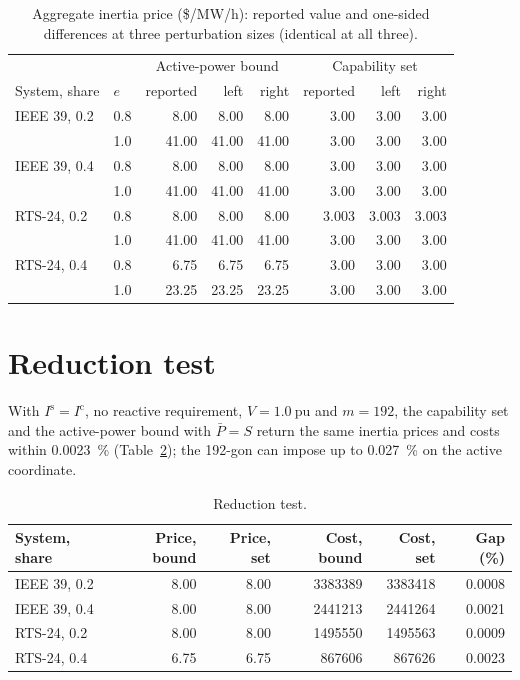 \documentclass[11pt,a4paper]{article}
\newcommand{\pu}{\ensuremath{\mathrm{pu}}}
\begin{document}
\begin{table}[h]
  \caption{Aggregate inertia price (\$/MW/h): reported value and one-sided
  differences at three perturbation sizes (identical at all three).}
  \label{tab:brackets}
  \centering
  \begin{tabular}{ll rrr rrr}
    \toprule
    & & \multicolumn{3}{c}{Active-power bound} & \multicolumn{3}{c}{Capability set} \\
    \cmidrule(lr){3-5}\cmidrule(l){6-8}
    System, share & $e$ & reported & left & right & reported & left & right \\
    \midrule
    IEEE 39, 0.2 & 0.8 & 8.00 & 8.00 & 8.00 & 3.00 & 3.00 & 3.00 \\
                 & 1.0 & 41.00 & 41.00 & 41.00 & 3.00 & 3.00 & 3.00 \\
    IEEE 39, 0.4 & 0.8 & 8.00 & 8.00 & 8.00 & 3.00 & 3.00 & 3.00 \\
                 & 1.0 & 41.00 & 41.00 & 41.00 & 3.00 & 3.00 & 3.00 \\
    RTS-24, 0.2  & 0.8 & 8.00 & 8.00 & 8.00 & 3.003 & 3.003 & 3.003 \\
                 & 1.0 & 41.00 & 41.00 & 41.00 & 3.00 & 3.00 & 3.00 \\
    RTS-24, 0.4  & 0.8 & 6.75 & 6.75 & 6.75 & 3.00 & 3.00 & 3.00 \\
                 & 1.0 & 23.25 & 23.25 & 23.25 & 3.00 & 3.00 & 3.00 \\
    \bottomrule
  \end{tabular}
\end{table}

\section{Reduction test}
\label{s:reduction}

With $I^{\mathrm{s}} = I^{\mathrm{c}}$, no reactive requirement,
$V = \SI{1.0}{\pu}$ and $m = 192$, the capability set and the active-power
bound with $\bar{P} = S$ return the same inertia prices and costs within
\SI{0.0023}{\percent} (Table~\ref{tab:reduction}); the 192-gon can impose up
to \SI{0.027}{\percent} on the active coordinate.

\begin{table}[h]
  \caption{Reduction test.}
  \label{tab:reduction}
  \centering
  \begin{tabular}{l rr rr r}
    \toprule
    System, share & Price, bound & Price, set & Cost, bound & Cost, set & Gap (\%) \\
    \midrule
    IEEE 39, 0.2 & 8.00 & 8.00 & 3383389 & 3383418 & 0.0008 \\
    IEEE 39, 0.4 & 8.00 & 8.00 & 2441213 & 2441264 & 0.0021 \\
    RTS-24, 0.2  & 8.00 & 8.00 & 1495550 & 1495563 & 0.0009 \\
    RTS-24, 0.4  & 6.75 & 6.75 & 867606 & 867626 & 0.0023 \\
    \bottomrule
  \end{tabular}
\end{table}
\end{document}
